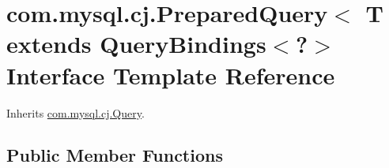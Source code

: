 \hypertarget{interfacecom_1_1mysql_1_1cj_1_1_prepared_query}{}\section{com.\+mysql.\+cj.\+Prepared\+Query$<$ T extends Query\+Bindings$<$?$>$ Interface Template Reference}
\label{interfacecom_1_1mysql_1_1cj_1_1_prepared_query}


Inherits \mbox{\hyperlink{interfacecom_1_1mysql_1_1cj_1_1_query}{com.\+mysql.\+cj.\+Query}}.

\subsection*{Public Member Functions}
